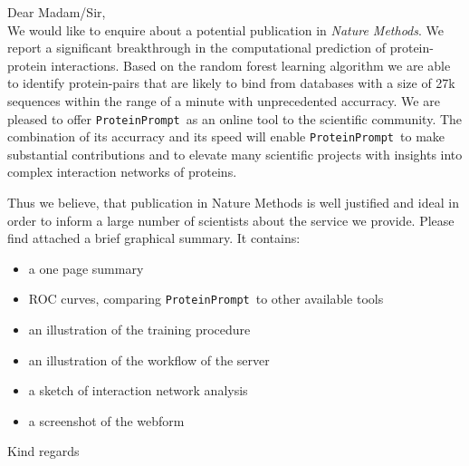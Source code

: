 \documentclass{article}
\newcommand{\tool}{\texttt{ProteinPrompt}}
\begin{document}
Dear Madam/Sir,\\

We would like to enquire about a potential publication in \textit{Nature Methods}.
We report a significant breakthrough in the computational prediction of protein-protein interactions.
Based on the random forest learning algorithm we are able to identify protein-pairs that are likely to bind from databases with a size of 27k sequences within the range of a minute with unprecedented accurracy.
We are pleased to offer \tool\ as an online tool to the scientific community.
The combination of its accurracy and its speed will enable \tool\ to make substantial contributions and to  elevate many scientific projects with insights into complex interaction networks of proteins. 

Thus we believe, that publication in Nature Methods is well justified and ideal in order to inform a large number of scientists about the service we provide.
Please find attached a brief graphical summary.
It contains:
\begin{itemize}
\item a one page summary
\item ROC curves, comparing \tool\ to other available tools
\item an illustration of the training procedure
\item an illustration of the workflow of the server
\item a sketch of interaction network analysis
\item a screenshot of the webform
\end{itemize}

Kind regards\\
\end{document}
